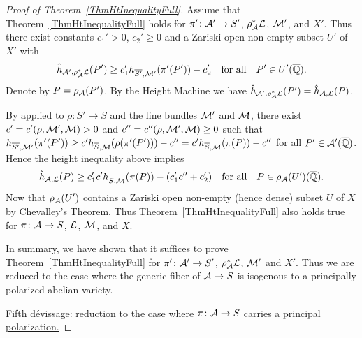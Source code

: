 \begin{proof}[Proof of Theorem~\ref{ThmHtInequalityFull}]
Assume that Theorem~\ref{ThmHtInequalityFull} holds for $\pi' \colon \mathcal{A}' \rightarrow S'$, $\rho_{\mathcal{A}}^*{\mathcal L}$, ${\mathcal M}'$, and $X'$. Thus there exist constants $c_1'>0$, $c_2' \ge 0$ and a Zariski open non-empty subset $U'$ of $X'$ with
\[
\hat{h}_{\mathcal{A}',\rho_{\mathcal{A}}^*{\mathcal L}}(P') \ge c_1' h_{\overline{S'},{\mathcal M}'}(\pi'(P')) - c_2' \quad \text{for all} \quad P' \in U'({\overline{\mathbb{Q}}}).
\]
Denote by $P = \rho_{\mathcal{A}}(P')$. 
By the Height Machine we have $\hat{h}_{\mathcal{A}',\rho_{\mathcal{A}}^*{\mathcal L}}(P') =
\hat{h}_{\mathcal{A},{\mathcal L}}(P)$.%

By  \cite[Lemma~4]{Silverman:heightest11} applied to $\rho \colon S' \rightarrow S$ and the line bundles ${\mathcal M}'$ and ${\mathcal M}$, there exist $c' = c' (\rho,{\mathcal M}',{\mathcal M}) > 0$ and $c'' = c''(\rho,{\mathcal M}',{\mathcal M}) \ge 0$ such that $h_{\overline{S'},{\mathcal M}'}(\pi'(P')) \ge c' h_{\overline{S},{\mathcal M}}(\rho(\pi'(P'))) - c'' = c' h_{\overline{S},{\mathcal M}}(\pi(P)) - c''$ for all $P' \in \mathcal{A}'({\overline{\mathbb{Q}}})$. Hence the height inequality above implies
\[
\hat{h}_{\mathcal{A},{\mathcal L}}(P) \ge c_1'c' h_{\overline{S},{\mathcal M}}(\pi(P)) - (c_1'c'' + c_2')\quad \text{for all}\quad P \in \rho_{\mathcal{A}}(U')({\overline{\mathbb{Q}}}).
\]
Now that $\rho_{\mathcal{A}}(U')$ contains a Zariski open non-empty (hence dense) subset $U$ of $X$ by Chevalley's Theorem. 
Thus Theorem~\ref{ThmHtInequalityFull} also holds true for $\pi \colon \mathcal{A} \rightarrow S$, ${\mathcal L}$, ${\mathcal M}$, and $X$.

In summary, we have shown that it suffices to prove Theorem~\ref{ThmHtInequalityFull} for $\pi' \colon \mathcal{A}' \rightarrow S'$, $\rho_{\mathcal{A}}^*{\mathcal L}$, ${\mathcal M}'$ and $X'$. Thus we are reduced to the case where the generic fiber of $\mathcal{A} \rightarrow S$ is isogenous to a principally polarized abelian variety.%


\ul{Fifth d\'{e}vissage: reduction to the case where $\pi \colon \mathcal{A} \rightarrow S$ carries a principal polarization.}


\end{proof}
